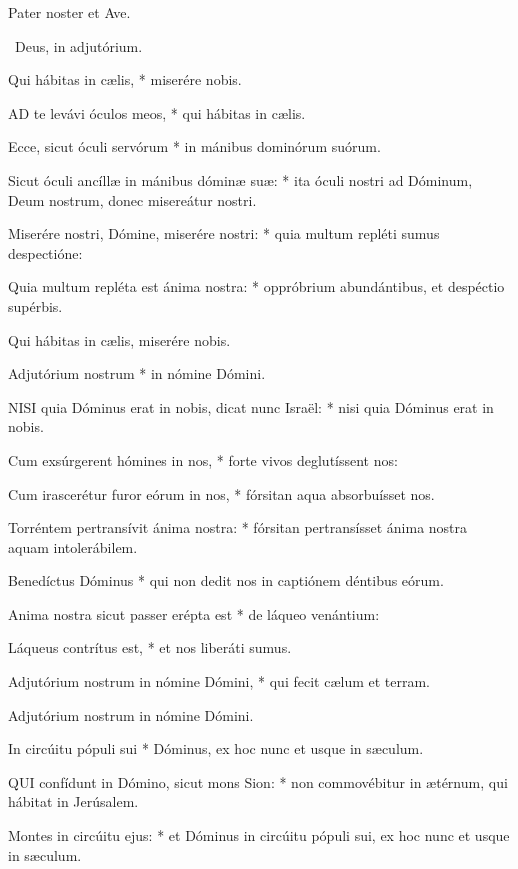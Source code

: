 Pater noster et Ave.

\V\ Deus, in adjutórium.

 Qui hábitas in cælis, * miserére nobis.


\lettrine[lines=2]{A}{D} te levávi óculos meos, * qui hábitas in cælis.

Ecce, sicut óculi servórum * in mánibus dominórum suórum.

Sicut óculi ancíllæ in mánibus dóminæ suæ: * ita óculi nostri ad Dóminum, Deum nostrum, donec misereátur nostri.

Miserére nostri, Dómine, miserére nostri: * quia multum repléti sumus despectióne:

Quia multum repléta est ánima nostra: * oppróbrium abundántibus, et despéctio supérbis.

 Qui hábitas in cælis, miserére nobis.

 Adjutórium nostrum * in nómine Dómini.


\lettrine[lines=2]{N}{ISI} quia Dóminus erat in nobis, dicat nunc Israël: * nisi quia Dóminus erat in nobis.

Cum exsúrgerent hómines in nos, * forte vivos deglutíssent nos:

Cum irascerétur furor eórum in nos, * fórsitan aqua absorbuísset nos.

Torréntem pertransívit ánima nostra: * fórsitan pertransísset ánima nostra aquam intolerábilem.

Benedíctus Dóminus * qui non dedit nos in captiónem déntibus eórum.

Anima nostra sicut passer erépta est * de láqueo venántium:

Láqueus contrítus est, * et nos liberáti sumus.

Adjutórium nostrum in nómine Dómini, * qui fecit cælum et terram.

 Adjutórium nostrum in nómine Dómini.

 In circúitu pópuli sui * Dóminus, ex hoc nunc et usque in sæculum.


\lettrine[lines=2]{Q}{UI} confídunt in Dómino, sicut mons Sion: * non commovébitur in ætérnum, qui hábitat in Jerúsalem.

Montes in circúitu ejus: * et Dóminus in circúitu pópuli sui, ex hoc nunc et usque in sæculum.

